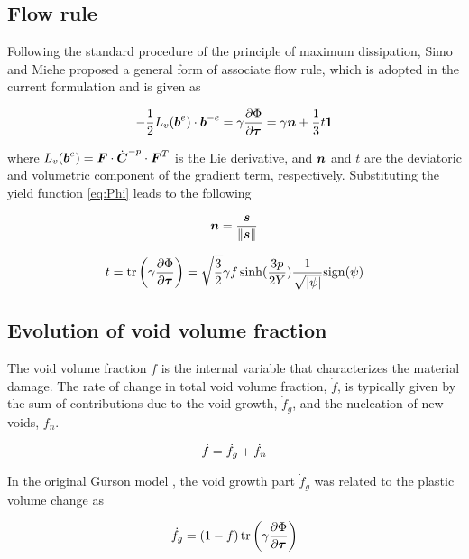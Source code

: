 \subsection{Flow rule}
Following the standard procedure of the principle of maximum
dissipation, Simo and Miehe \cite{Simo1992} proposed a general form of
associate flow rule, which is adopted in the current formulation and
is given as

\begin{equation}\label{eq:flowRule}
-\frac{1}{2}L_v({\boldsymbol{b}}^e)\cdot{\boldsymbol{b}}^{-e} =
\gamma\frac{\partial\Phi}{\partial{\boldsymbol{\tau}}}=\gamma{\boldsymbol{n}} +
\frac{1}{3}t\boldsymbol{1}
\end{equation}

where $L_v({\boldsymbol{b}}^e)={\boldsymbol{F}} \cdot \dot{{\boldsymbol{C}}}^{-p} \cdot {\boldsymbol{F}}^T$ is the Lie
derivative, and ${\boldsymbol{n}}$ and $t$ are the deviatoric and volumetric
component of the gradient term, respectively. Substituting the yield
function \eqref{eq:Phi} leads to the following

\begin{equation}\label{eq:n}
{\boldsymbol{n}} = \frac{{\boldsymbol{s}}}{\|{\boldsymbol{s}}\|}
\end{equation}

\begin{equation}\label{eq:t}
t = \operatorname{\text{tr}} \left( \gamma \frac{\partial\Phi}{\partial{\boldsymbol{\tau}}}\right) =
\sqrt{\frac{3}{2}}\gamma f \sinh (\frac{3p}{2
  Y})\frac{1}{\sqrt{|\psi|}} {\rm sign}(\psi)
\end{equation}

\subsection{Evolution of void volume fraction}
The void volume fraction $f$ is the internal variable that
characterizes the material damage. The rate of change in total void
volume fraction, $\dot{f}$, is typically given by the sum of
contributions due to the void growth, $\dot{f}_g$, and the nucleation
of new voids, $\dot{f}_{n}$.

\begin{equation}\label{eq:dotf}
\dot{f} = \dot{f}_g + \dot{f}_{n}\\
\end{equation}

In the original Gurson model \cite{Gurson1977}, the void growth part
$\dot{f}_g$ was related to the plastic volume change as

\begin{equation}\label{eq:fg_orig}
\dot{f}_g = (1-f)\operatorname{\text{tr}}\left( \gamma\frac{\partial\Phi}{\partial{\boldsymbol{\tau}}}
\right)
\end{equation}

